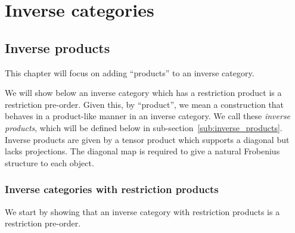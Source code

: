 \chapter{Inverse categories} %
\label{cha:inverse_categories}
\section{Inverse products} %
\label{sec:inverse_products}

This chapter will focus on adding ``products'' to an inverse category.

We will show below an inverse category which has a
restriction product is a restriction pre-order. Given this, by ``product'', we mean a construction
that behaves in a product-like manner in an inverse category. We call these \emph{inverse products}, which
will be defined below in sub-section~\ref{sub:inverse_products}.
Inverse products are given by a tensor product which supports a diagonal but lacks projections. The
diagonal map is required to give a natural Frobenius structure to each object.

\subsection{Inverse categories with restriction products} %
\label{sub:inverse_categories_with_restriction_products}
We start by showing that an inverse category with restriction products is a restriction pre-order.


